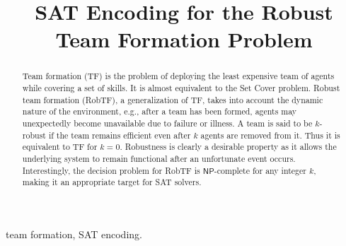 \documentclass[conference]{IEEEtran}
\theoremstyle{definition}
\begin{document}
\title{SAT Encoding for the Robust Team Formation Problem}

\author{
	\and
	\and 
	\and
}


\maketitle

\begin{abstract}
Team formation (TF) is the problem of deploying the least expensive team of agents 
while covering a set of skills. It is almost equivalent to the Set Cover problem.
Robust team formation (RobTF), a generalization of TF,
takes into account the dynamic nature of the environment, e.g., after 
a team has been formed, agents may unexpectedly become unavailable
due to failure or illness.
A team is said to be $k$-robust if the team remains efficient even after $k$ agents are removed from it.
Thus it is equivalent to TF for $k=0$.
Robustness is clearly a desirable property as it allows the underlying system to remain 
functional after an unfortunate event occurs.
Interestingly, the decision problem for RobTF is $\mathsf{NP}$-complete for any integer $k$,
making it an appropriate target for SAT solvers.
\end{abstract}

\begin{IEEEkeywords}
team formation, SAT encoding.
\end{IEEEkeywords}
\end{document}
